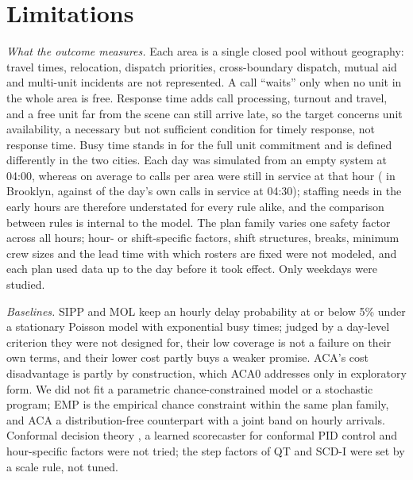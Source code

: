 \documentclass[12pt]{article}
\begin{document}
\section{Limitations}

\emph{What the outcome measures.} Each area is a single closed pool without geography: travel times, relocation, dispatch priorities, cross-boundary dispatch, mutual aid and multi-unit incidents are not represented. A call ``waits'' only when no unit in the whole area is free. Response time adds call processing, turnout and travel, and a free unit far from the scene can still arrive late, so the target concerns unit availability, a necessary but not sufficient condition for timely response, not response time. Busy time stands in for the full unit commitment and is defined differently in the two cities. Each day was simulated from an empty system at 04:00, whereas on average  to  calls per area were still in service at that hour ( in Brooklyn, against  of the day's own calls in service at 04:30); staffing needs in the early hours are therefore understated for every rule alike, and the comparison between rules is internal to the model. The plan family varies one safety factor across all hours; hour- or shift-specific factors, shift structures, breaks, minimum crew sizes and the lead time with which rosters are fixed were not modeled, and each plan used data up to the day before it took effect. Only weekdays were studied.

\emph{Baselines.} SIPP and MOL keep an hourly delay probability at or below 5\% under a stationary Poisson model with exponential busy times; judged by a day-level criterion they were not designed for, their low coverage is not a failure on their own terms, and their lower cost partly buys a weaker promise. ACA's cost disadvantage is partly by construction, which ACA0 addresses only in exploratory form. We did not fit a parametric chance-constrained model \citep{gurvich2010staffing} or a stochastic program; EMP is the empirical chance constraint within the same plan family, and ACA a distribution-free counterpart with a joint band on hourly arrivals. Conformal decision theory \citep{lekeufack2024conformal}, a learned scorecaster for conformal PID control and hour-specific factors were not tried; the step factors of QT and SCD-I were set by a scale rule, not tuned.
\end{document}
